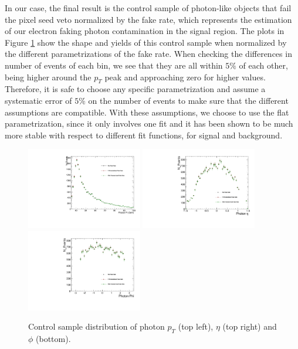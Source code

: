 In our case, the final result is the control sample of photon-like objects that fail the pixel seed veto normalized by the fake rate, which represents the estimation of our electron faking photon contamination in the signal region. The plots in Figure \ref{CS_params} show the shape and yields of this control sample when normalized by the different parametrizations of the fake rate. When checking the differences in number of events of each bin, we see that they are all within $5\%$ of each other, being higher around the $p_T$ peak and approaching zero for higher values. Therefore, it is safe to choose any specific parametrization and assume a systematic error of $5\%$ on the number of events to make sure that the different assumptions are compatible. With these assumptions, we choose to use the flat parametrization, since it only involves one fit and it has been shown to be much more stable with respect to different fit functions, for signal and background.


\begin{figure}[H]
\begin{center}
  {\includegraphics[width=0.45\textwidth]{efake_figs/CS_param_pt.pdf}}
  {\includegraphics[width=0.45\textwidth]{efake_figs/CS_param_eta.pdf}}
\\
  {\includegraphics[width=0.45\textwidth]{efake_figs/CS_param_phi.pdf}}
\caption{Control sample distribution of photon $p_T$ (top left), $\eta$ (top right) and $\phi$ (bottom).}
\label{CS_params}
\end{center}
\end{figure}

